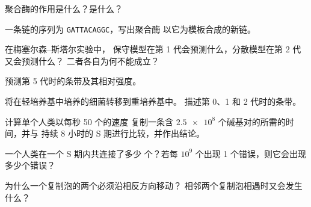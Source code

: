 \begin{exercise}[$\star$]\label{exo:g11:dna-replication:4}
 聚合酶的作用是什么？是什么？
\end{exercise}

\begin{exercise}[$\star$]\label{exo:g11:dna-replication:5}
一条链的序列为 \texttt{GATTACAGGC}，写出聚合酶
以它为模板合成的新链。
\end{exercise}

\begin{exercise}[$\star\star$]\label{exo:g11:dna-replication:6}
在梅塞尔森–斯塔尔实验中，
保守模型在第 1 代会预测什么，分散模型在第 2 代又会预测什么？
二者各自为何不能成立？
\end{exercise}

\begin{exercise}[$\star\star$]\label{exo:g11:dna-replication:7}
预测第 5 代时的条带及其相对强度。
\end{exercise}

\begin{exercise}[$\star\star$]\label{exo:g11:dna-replication:8}
将在轻培养基中培养的细菌转移到重培养基中。
描述第 0、1 和 2 代时的条带。
\end{exercise}

\begin{exercise}[$\star\star$]\label{exo:g11:dna-replication:9}
计算单个人类以每秒 50 个的速度
复制一条含 $\num{2.5e8}$ 个碱基对的所需的时间，并与
持续 8 小时的 S 期进行比较，并作出结论。
\end{exercise}

\begin{exercise}[$\star\star$]\label{exo:g11:dna-replication:10}
一个人类在一个 S 期内共连接了多少
个？若每 $10^9$ 个出现 1 个错误，则它会出现多少个错误？
\end{exercise}

\begin{exercise}[$\star\star$]\label{exo:g11:dna-replication:11}
为什么一个复制泡的两个必须沿相反方向移动？
相邻两个复制泡相遇时又会发生什么？
\end{exercise}

